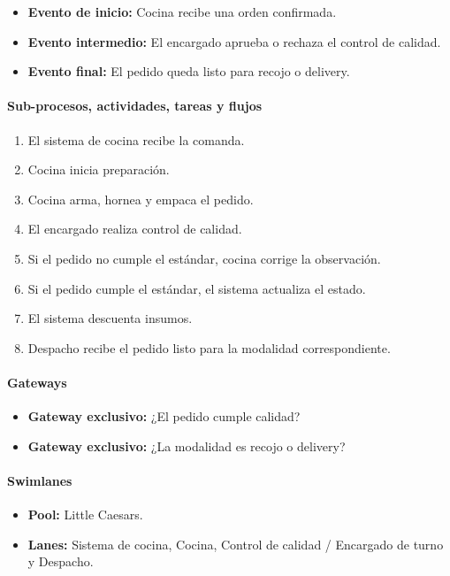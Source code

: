\documentclass[a4paper,12pt]{article}
\begin{document}
\begin{itemize}
    \item \textbf{Evento de inicio:} Cocina recibe una orden confirmada.
    \item \textbf{Evento intermedio:} El encargado aprueba o rechaza el control de calidad.
    \item \textbf{Evento final:} El pedido queda listo para recojo o delivery.
\end{itemize}

\paragraph{Sub-procesos, actividades, tareas y flujos}

\begin{enumerate}
    \item El sistema de cocina recibe la comanda.
    \item Cocina inicia preparación.
    \item Cocina arma, hornea y empaca el pedido.
    \item El encargado realiza control de calidad.
    \item Si el pedido no cumple el estándar, cocina corrige la observación.
    \item Si el pedido cumple el estándar, el sistema actualiza el estado.
    \item El sistema descuenta insumos.
    \item Despacho recibe el pedido listo para la modalidad correspondiente.
\end{enumerate}

\paragraph{Gateways}

\begin{itemize}
    \item \textbf{Gateway exclusivo:} ¿El pedido cumple calidad?
    \item \textbf{Gateway exclusivo:} ¿La modalidad es recojo o delivery?
\end{itemize}

\paragraph{Swimlanes}

\begin{itemize}
    \item \textbf{Pool:} Little Caesars.
    \item \textbf{Lanes:} Sistema de cocina, Cocina, Control de calidad / Encargado de turno y Despacho.
\end{itemize}
\end{document}
